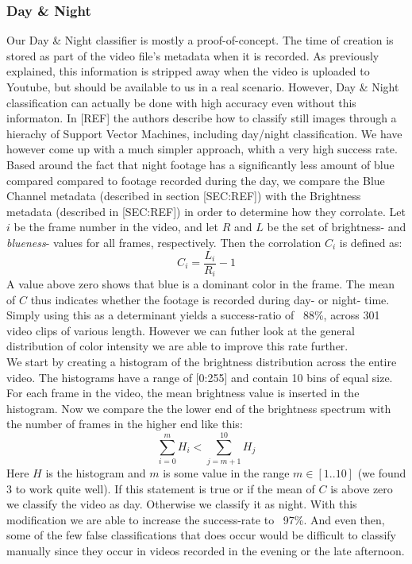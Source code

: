 \subsubsection{Day \& Night}
%
Our Day \& Night classifier is mostly a proof-of-concept. The time of creation is stored as part of the video file's metadata when it is recorded. As previously explained, this information is stripped away when the video is uploaded to Youtube, but should be available to us in a real scenario. However, Day \& Night classification can actually be done with high accuracy even without this informaton. In [REF] the authors describe how to classify still images through a hierachy of Support Vector Machines, including day/night classification. We have however come up with a much simpler approach, whith a very high success rate.\\
Based around the fact that night footage has a significantly less amount of blue compared compared to footage recorded during the day, we compare the Blue Channel metadata (described in section [SEC:REF]) with the Brightness metadata (described in [SEC:REF]) in order to determine how they corrolate. Let $i$ be the frame number in the video, and let $R$ and $L$ be the set of brightness- and \textit{blueness}- values for all frames, respectively. Then the corrolation $C_{i}$ is defined as:\\
%
\begin{equation}
C_{i} = \frac{L_{i}}{R_{i}} - 1
\end{equation}
%
A value above zero shows that blue is a dominant color in the frame. The mean of $C$ thus indicates whether the footage is recorded during day- or night- time. Simply using this as a determinant yields a success-ratio of ~88\%, across 301 video clips of various length. However we can futher look at the general distribution of color intensity we are able to improve this rate further.\\
We start by creating a histogram of the brightness distribution across the entire video. The histograms have a range of [0:255] and contain 10 bins of equal size. For each frame in the video, the mean brightness value is inserted in the histogram. Now we compare the the lower end of the brightness spectrum with the number of frames in the higher end like this:
%
\begin{equation}
\sum_{i=0}^{m}H_{i} < \sum_{j=m+1}^{10}H_{j}
\end{equation}
%
Here $H$ is the histogram and $m$ is some value in the range $m\in [1..10]$ (we found $3$ to work quite well). If this statement is true or if the mean of $C$ is above zero we classify the video as day. Otherwise we classify it as night. With this modification we are able to increase the success-rate to ~97\%. And even then, some of the few false classifications that does occur would be difficult to classify manually since they occur in videos recorded in the evening or the late afternoon.
